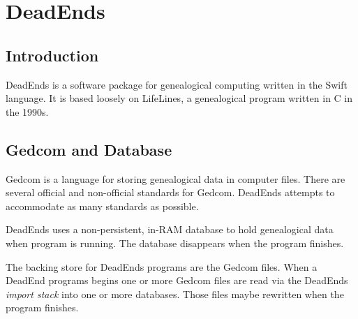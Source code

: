 \section{DeadEnds}
\subsection{Introduction}

DeadEnds is a software package for genealogical computing written in
the Swift language.
It is based loosely on LifeLines, a genealogical program written in
C in the 1990s.

\subsection{Gedcom and Database}

Gedcom is a language for storing genealogical data in computer files.
There are several official and non-official standards for Gedcom.
DeadEnds attempts to accommodate as many
standards as possible.

DeadEnds uses a non-persistent, in-RAM database to hold genealogical
data when program is running. The database disappears when
the program finishes.

The backing store for DeadEnds programs are the Gedcom files. When a
DeadEnd programs begins one or more Gedcom files are read via the
DeadEnds \emph{import stack} into one or more databases.
Those files maybe rewritten when the program finishes.



